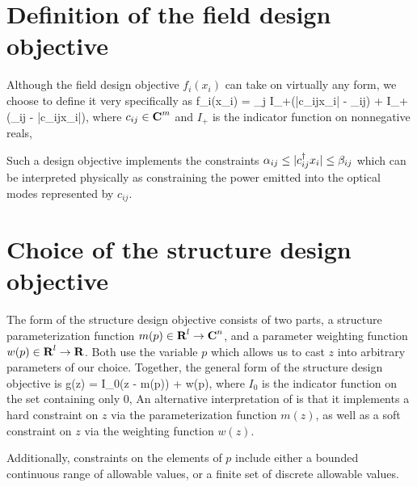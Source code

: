 \section{Definition of the field design objective}
Although the field design objective $f_i(x_i)$ 
    can take on virtually any form,
    we choose to define it very specifically as
        {f_i(x_i) = \sum_j I_+(|c_{ij}\T x_i| - \alpha_{ij})
            + I_+(\beta_{ij} - |c_{ij}\T x_i|),}
    where $c_{ij} \in {\mbox{\bf C}}^m$ and 
    $I_+$ is the indicator function on nonnegative reals,

Such a design objective implements the constraints 
    $\alpha_{ij} \le |c_{ij}^\dagger x_i| \le \beta_{ij}$
    which can be interpreted physically as 
    constraining the power emitted into the optical modes
    represented by $c_{ij}$.

\section{Choice of the structure design objective}
The form of the structure design objective consists of two parts,
    \BI a structure parameterization function 
        $m(p) \in {\mbox{\bf R}}^l \to {\mbox{\bf C}}^n$, and 
    \I  a parameter weighting function $w(p)\in {\mbox{\bf R}}^l \to {\mbox{\bf R}}$. \EI
Both use the variable $p$ which allows us 
    to cast $z$ into arbitrary parameters of our choice.
Together, the general form of the structure design objective is
        {g(z) = I_0(z - m(p)) + w(p),}
    where $I_0$ is the indicator function on the set containing only $0$,
An alternative interpretation of  
    is that it implements a hard constraint on $z$ 
    via the parameterization function $m(z)$,
    as well as a soft constraint on $z$ 
    via the weighting function $w(z)$.

Additionally, constraints on the elements of $p$ include either
    a bounded continuous range of allowable values, or
    a finite set of discrete allowable values.



